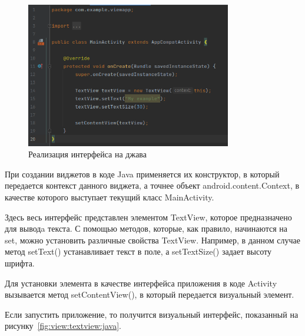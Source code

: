 \begin{figure}[h!tp]
	\centering
	\includegraphics[width=0.8\textwidth]{Screenshot from 2023-03-09 18-10-05.png}
	\caption{Реализация интерфейса на джава}
	\label{fig:activity:layout:java}
\end{figure}

При создании виджетов в коде Java применяется их конструктор, в который
передается контекст данного виджета, а точнее объект
android.content.Context, в качестве которого выступает текущий класс
MainActivity.\par
Здесь весь интерфейс представлен элементом TextView, которое
предназначено для выводa текста. С помощью методов, которые, как
правило, начинаются на set, можно установить различные свойства TextView.
Например, в данном случае метод setText() устанавливает текст в поле, а
setTextSize() задает высоту шрифта.\par
Для установки элемента в качестве интерфейса приложения в коде Activity
вызывается метод setContentView(), в который передается визуальный
элемент.\par
Если запустить приложение, то получится визуальный интерфейс, показанный
на рисунку~\ref{fig:view:textview:java}.

